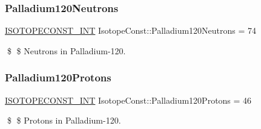 \subsubsection{\texorpdfstring{Palladium120\+Neutrons}{Palladium120Neutrons}}
{\footnotesize\ttfamily \mbox{\hyperlink{group___isotope_const-_macros_ga5f18360b3e99483a35c32d789e62621c}{I\+S\+O\+T\+O\+P\+E\+C\+O\+N\+S\+T\+\_\+\+I\+NT}} Isotope\+Const\+::\+Palladium120\+Neutrons = 74}

\$ \$ Neutrons in Palladium-\/120. \mbox{\label{group___isotope_const-_palladium-_pd120_ga828708d584cecc01c67f5f9f2599c92a}} 
\subsubsection{\texorpdfstring{Palladium120\+Protons}{Palladium120Protons}}
{\footnotesize\ttfamily \mbox{\hyperlink{group___isotope_const-_macros_ga5f18360b3e99483a35c32d789e62621c}{I\+S\+O\+T\+O\+P\+E\+C\+O\+N\+S\+T\+\_\+\+I\+NT}} Isotope\+Const\+::\+Palladium120\+Protons = 46}

\$ \$ Protons in Palladium-\/120. 